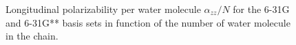\documentclass[prl,aps,twocolumn,showpacs,twocolumngrid,superbib]{revtex4}
\begin{document}
\begin{figure}[t]
  \caption{\protect
    Longitudinal polarizability per water molecule
    $\alpha_{zz}/N$ for 
    the 6-31G and 6-31G** basis sets in function
    of the number of water molecule in the chain.
  }\label{fig:Alpha_1D}
\end{figure}
\end{document}
